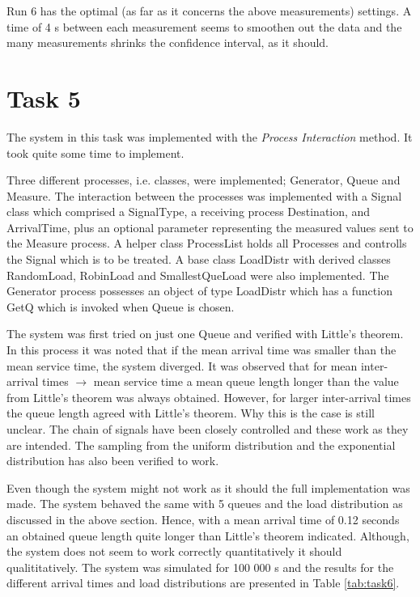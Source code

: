 \documentclass[]{article}
\begin{document}
Run 6 has the optimal (as far as it concerns the above measurements) settings.
A time of 4 s between each measurement seems to smoothen out the data and the many measurements shrinks the confidence interval, as it should.

\section{Task 5}
The system in this task was implemented with the {\it Process Interaction} method.
It took quite some time to implement.

Three different processes, i.e. classes, were implemented; Generator, Queue and Measure.
The interaction between the processes was implemented with a Signal class which comprised a SignalType, a receiving process Destination, and ArrivalTime, plus an optional parameter representing the measured values sent to the Measure process.
A helper class ProcessList holds all Processes and controlls the Signal which is to be treated.
A base class LoadDistr with derived classes RandomLoad, RobinLoad and SmallestQueLoad were also implemented.
The Generator process possesses an object of type LoadDistr which has a function GetQ which is invoked when Queue is chosen.

The system was first tried on just one Queue and verified with Little's theorem.
In this process it was noted that if the mean arrival time was smaller than the mean service time, the system diverged.
It was observed that for mean inter-arrival times $\rightarrow$ mean service time a mean queue length longer than the value from Little's theorem was always obtained.
However, for larger inter-arrival times the queue length agreed with Little's theorem.
Why this is the case is still unclear.
The chain of signals have been closely controlled and these work as they are intended.
The sampling from the uniform distribution and the exponential distribution has also been verified to work.

Even though the system might not work as it should the full implementation was made.
The system behaved the same with 5 queues and the load distribution as discussed in the above section.
Hence, with a mean arrival time of 0.12 seconds an obtained queue length quite longer than Little's theorem indicated.
Although, the system does not seem to work correctly quantitatively it should qualititatively.
The system was simulated for 100 000 s and the results for the different arrival times and load distributions are presented in Table \ref{tab:task6}.
\end{document}
